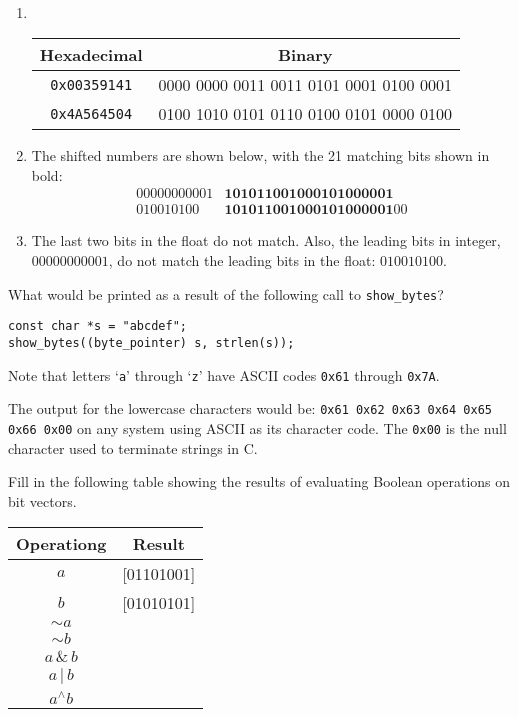 \documentclass[12pt]{article}
\newenvironment{ex}[2][Exercise]{\begin{trivlist}
		\item[\hskip \labelsep {\bfseries #1}\hskip \labelsep {\bfseries #2.}]}{\end{trivlist}}
\newenvironment{sol}[1][Solution]{\begin{trivlist}
		\item[\hskip \labelsep {\bfseries #1:}]}{\end{trivlist}}
\begin{document}
\begin{sol}
	\
	\begin{enumerate}
		\item \
		\begin{center}
			\begin{tabular}{c|c}
				Hexadecimal & Binary\\
				\hline
				\texttt{0x00359141} &  0000 0000 0011 0011 0101 0001 0100 0001\\
				\texttt{0x4A564504} & 0100 1010 0101 0110 0100 0101 0000 0100
			\end{tabular}
		\end{center}
		\item The shifted numbers are shown below, with the 21 matching bits shown in
		bold:
		\begin{align*}
					00000000001 &\textbf{101011001000101000001}\\
	        		  010010100 &\textbf{101011001000101000001}00
		\end{align*}
		\item The last two bits in the float do not match. Also, the leading bits
		in integer, $00000000001$, do not match the leading bits in the float:
		$010010100$.
	\end{enumerate}
\end{sol}

\begin{ex}{2.7}
	What would be printed as a result of the following call to \texttt{show\_bytes}?
	\begin{lstlisting}
const char *s = "abcdef";
show_bytes((byte_pointer) s, strlen(s));
	\end{lstlisting}
	Note that letters `\texttt{a}' through `\texttt{z}' have ASCII codes \texttt{0x61}
	through \texttt{0x7A}.
\end{ex}

\begin{sol}
	The output for the lowercase characters would be: \texttt{0x61 0x62 0x63 0x64 0x65 0x66 0x00}
	on any system using ASCII as its character code. The \texttt{0x00} is the null character
	used to terminate strings in C.
\end{sol}

\begin{ex}{2.8}
	Fill in the following table showing the results of evaluating Boolean operations on
	bit vectors.
	\begin{center}
		\begin{tabular}{cc}
			Operationg & Result\\
			\hline
			$a$ & [01101001]\\
			$b$ & [01010101]\\
			$\sim a$ & \makebox[1cm]{\hrulefill} \\
			$\sim b$ & \makebox[1cm]{\hrulefill} \\
			$a\, \& \,b$ & \makebox[1cm]{\hrulefill} \\
			$a \, | \, b$ & \makebox[1cm]{\hrulefill} \\
			$a ^\wedge b $ & \makebox[1cm]{\hrulefill} 
		\end{tabular}
	\end{center}
\end{ex}
\end{document}
